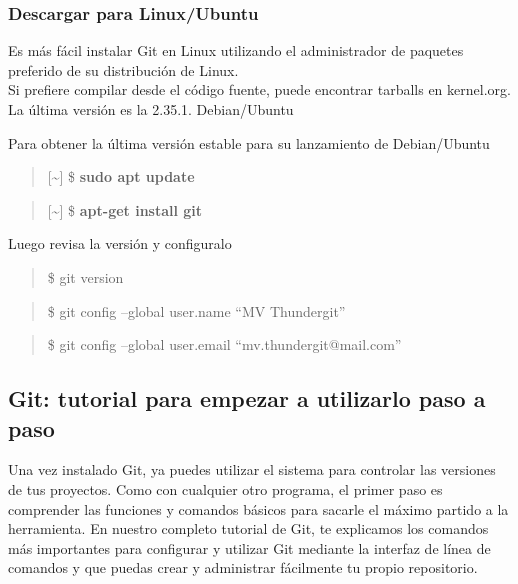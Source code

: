 \documentclass[11pt]{article}
\begin{document}
\hypertarget{descargar-para-linuxubuntu}{%
\subsubsection{Descargar para
Linux/Ubuntu}\label{descargar-para-linuxubuntu}}

Es más fácil instalar Git en Linux utilizando el administrador de
paquetes preferido de su distribución de Linux.\\
Si prefiere compilar desde el código fuente, puede encontrar tarballs en
kernel.org. La última versión es la 2.35.1. Debian/Ubuntu

Para obtener la última versión estable para su lanzamiento de
Debian/Ubuntu

\begin{quote}
{[}\textasciitilde{}{]} \$ \textbf{sudo apt update}
\end{quote}

\begin{quote}
{[}\textasciitilde{}{]} \$ \textbf{apt-get install git}
\end{quote}

    Luego revisa la versión y configuralo

\begin{quote}
\$ git version
\end{quote}

\begin{quote}
\$ git config --global user.name ``MV Thundergit''
\end{quote}

\begin{quote}
\$ git config --global user.email ``mv.thundergit@mail.com''
\end{quote}

    \hypertarget{git-tutorial-para-empezar-a-utilizarlo-paso-a-paso}{%
\subsection{Git: tutorial para empezar a utilizarlo paso a
paso}\label{git-tutorial-para-empezar-a-utilizarlo-paso-a-paso}}

Una vez instalado Git, ya puedes utilizar el sistema para controlar las
versiones de tus proyectos. Como con cualquier otro programa, el primer
paso es comprender las funciones y comandos básicos para sacarle el
máximo partido a la herramienta. En nuestro completo tutorial de Git, te
explicamos los comandos más importantes para configurar y utilizar Git
mediante la interfaz de línea de comandos y que puedas crear y
administrar fácilmente tu propio repositorio.
\end{document}
